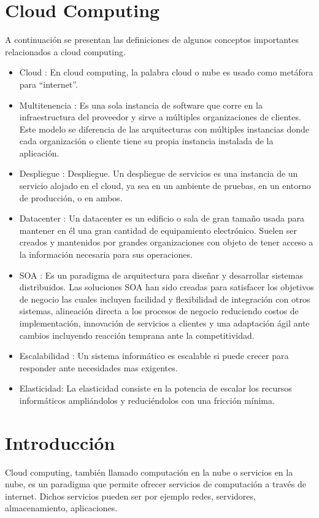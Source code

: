 \section{Cloud Computing}
 A continuación se presentan las definiciones de algunos conceptos importantes relacionados a cloud computing.
\begin{itemize}
\item Cloud : En cloud computing, la palabra cloud o nube es usado como metáfora para “internet”. 
\item Multitenencia : Es una sola instancia de software que corre en la infraestructura del proveedor y sirve a múltiples organizaciones de clientes. Este modelo se diferencia de las arquitecturas con múltiples instancias donde cada organización o cliente tiene su propia instancia instalada de la aplicación. 
\item Despliegue : Despliegue. Un despliegue de servicios es una instancia de un servicio alojado en el cloud, ya sea en un ambiente de pruebas, en un entorno de producción, o en ambos.
\item Datacenter : Un datacenter es un edificio o sala de gran tamaño usada para mantener en él una gran cantidad de equipamiento electrónico. Suelen ser creados y mantenidos por grandes organizaciones con objeto de tener acceso a la información necesaria para sus operaciones.
\item SOA : Es un paradigma de arquitectura para diseñar y desarrollar sistemas distribuidos. Las soluciones  SOA  han sido creadas para satisfacer los objetivos de negocio las cuales incluyen facilidad y flexibilidad de integración con otros sistemas, alineación directa a los procesos de negocio reduciendo costos de implementación, innovación de servicios a clientes y una adaptación ágil ante cambios incluyendo reacción temprana ante la competitividad.
\item Escalabilidad : Un sistema informático es escalable si puede crecer para responder ante necesidades mas exigentes. 
\item Elasticidad: La elasticidad consiste en la potencia de escalar los 
recursos informáticos ampliándolos y reduciéndolos con una fricción mínima. 
\end{itemize}


\section{Introducción}
Cloud computing, también llamado computación en la nube o servicios en la nube, es un paradigma que permite ofrecer servicios de computación a través de internet. Dichos servicios pueden ser por ejemplo redes, servidores, almacenamiento, aplicaciones.

